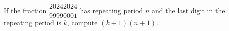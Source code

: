 If the fraction $\dfrac{20242024}{99990001}$ has repeating period $n$ and the last digit in the repeating period is $k$, compute $(k + 1)(n + 1)$.
